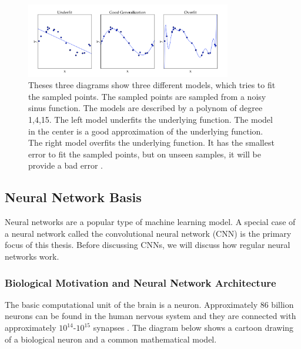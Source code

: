 \begin{figure}[h]
	\centering
	\includegraphics[width=0.8\textwidth]{Figures/Section3_Fitting}
	\caption{Theses three diagrams show three different models, which tries to fit the sampled points. The sampled points are sampled from a noisy sinus function. The models are described by a polynom of degree {1,4,15}. The left model underfits the underlying function. The model in the center is a good approximation of the underlying function. The right model overfits the underlying function. It has the smallest error to fit the sampled points, but on unseen samples, it will be provide a bad error \cite{goodfellow2016deep}.}
	\label{fig: fitting}
\end{figure}

\subsection{Neural Network Basis}
Neural networks are a popular type of machine learning model. A special case of a neural network called the convolutional neural network (CNN) is the primary focus of this thesis. Before discussing CNNs, we will discuss how regular neural networks work.

\subsubsection*{Biological Motivation and Neural Network Architecture}
The basic computational unit of the brain is a neuron. Approximately 86 billion neurons can be found in the human nervous system and they are connected with approximately $10^{14}$-$10^{15}$ synapses \cite{long2008scalable}. The diagram below shows a cartoon drawing of a biological neuron and a common mathematical model.

